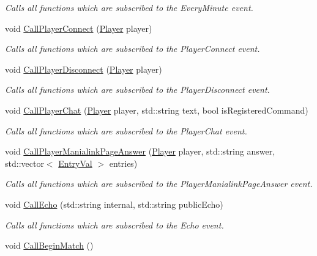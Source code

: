 \begin{DoxyCompactItemize}
\begin{DoxyCompactList}\small\item\em Calls all functions which are subscribed to the Every\-Minute event. \end{DoxyCompactList}\item 
void \hyperlink{classEventManager_a8ba57f2276badf2fef783b2480b0fd46}{Call\-Player\-Connect} (\hyperlink{structPlayer}{Player} player)
\begin{DoxyCompactList}\small\item\em Calls all functions which are subscribed to the Player\-Connect event. \end{DoxyCompactList}\item 
void \hyperlink{classEventManager_aeef81d4160c3312c098ad72679a07c44}{Call\-Player\-Disconnect} (\hyperlink{structPlayer}{Player} player)
\begin{DoxyCompactList}\small\item\em Calls all functions which are subscribed to the Player\-Disconnect event. \end{DoxyCompactList}\item 
void \hyperlink{classEventManager_a3df8918a788166d644ba8aa40b1e07b1}{Call\-Player\-Chat} (\hyperlink{structPlayer}{Player} player, std\-::string text, bool is\-Registered\-Command)
\begin{DoxyCompactList}\small\item\em Calls all functions which are subscribed to the Player\-Chat event. \end{DoxyCompactList}\item 
void \hyperlink{classEventManager_a4c2592deef52ebb2c84c83d7116705c8}{Call\-Player\-Manialink\-Page\-Answer} (\hyperlink{structPlayer}{Player} player, std\-::string answer, std\-::vector$<$ \hyperlink{structEntryVal}{Entry\-Val} $>$ entries)
\begin{DoxyCompactList}\small\item\em Calls all functions which are subscribed to the Player\-Manialink\-Page\-Answer event. \end{DoxyCompactList}\item 
void \hyperlink{classEventManager_ae48cfdfa5fc3a9492617d48aeef9669b}{Call\-Echo} (std\-::string internal, std\-::string public\-Echo)
\begin{DoxyCompactList}\small\item\em Calls all functions which are subscribed to the Echo event. \end{DoxyCompactList}\item 
\hypertarget{classEventManager_a22f3afb58eecc76787530b98e29971e2}{void \hyperlink{classEventManager_a22f3afb58eecc76787530b98e29971e2}{Call\-Begin\-Match} ()}\label{classEventManager_a22f3afb58eecc76787530b98e29971e2}


\end{DoxyCompactItemize}
